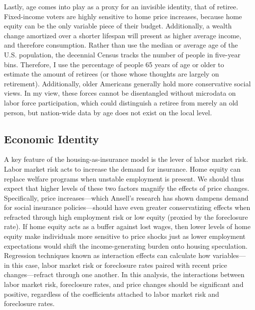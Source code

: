 \documentclass[12pt,oneside]{psthesis}
\begin{document}
Lastly, age comes into play as a proxy for an invisible identity, that of retiree.
Fixed-income voters are highly sensitive to home price increases, because home equity can be the only variable piece of their budget.
Additionally, a wealth change amortized over a shorter lifespan will present as higher average income, and therefore consumption.
Rather than use the median or average age of the U.S. population, the decennial Census tracks the number of people in five-year bins.
Therefore, I use the percentage of people 65 years of age or older to estimate the amount of retirees (or those whose thoughts are largely on retirement).
Additionally, older Americans generally hold more conservative social views.
In my view, these forces cannot be disentangled without microdata on labor force participation, which could distinguish a retiree from merely an old person, but nation-wide data by age does not exist on the local level.

\hypertarget{economic-identity}{%
\subsection{Economic Identity}\label{economic-identity}}

A key feature of the housing-as-insurance model is the lever of labor market risk.
Labor market risk acts to increase the demand for insurance.
Home equity can replace welfare programs when unstable employment is present.
We should thus expect that higher levels of these two factors magnify the effects of price changes.
Specifically, price increases---which Ansell's research has shown dampens demand for social insurance policies---should have even greater conservatizing effects when refracted through high employment risk or low equity (proxied by the foreclosure rate).
If home equity acts as a buffer against lost wages, then lower levels of home equity make individuals more sensitive to price shocks just as lower employment expectations would shift the income-generating burden onto housing speculation.
Regression techniques known as interaction effects can calculate how variables---in this case, labor market risk or foreclosure rates paired with recent price changes---refract through one another.
In this analysis, the interactions between labor market risk, foreclosure rates, and price changes should be significant and positive, regardless of the coefficients attached to labor market risk and foreclosure rates.
\end{document}
